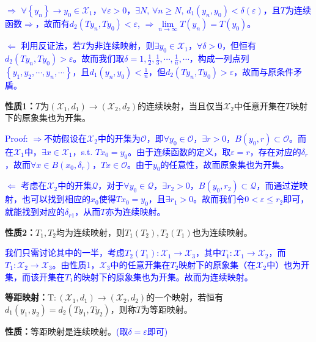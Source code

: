 \textcolor{blue}{$\Longrightarrow$ $\forall \left\lbrace y_n \right\rbrace\rightarrow y_0\in\mathscr{X}_1$，$\forall \varepsilon >0$，$\exists N$, $\forall n\ge N$, $d_1(y_n, y_0)<\delta(\varepsilon)$，且$T$为连续函数$\Longrightarrow$，故而有$d_2(Ty_n, Ty_0)<\varepsilon$, $\Longrightarrow \lim\limits_{n\to\infty} T(y_n) = T(y_0)$。}

\textcolor{blue}{$\Longleftarrow$ 利用反证法，若$T$为非连续映射，则$\exists y_0\in\mathscr{X}_1$，$\forall \delta>0$，但恒有$d_2(Ty_n, Ty_0)>\varepsilon$。故而我们取$\delta = 1, \frac{1}{2}, \frac{1}{3}, \cdots, \frac{1}{n}, \cdots$，构成一列点列$\left\lbrace y_1, y_2, \cdots, y_n, \cdots\right\rbrace$，且$d_1(y_n, y_0)<\frac{1}{n}$，但$d_2(Ty_n, Ty_0)>\varepsilon$，故而与原条件矛盾。}

\textbf{性质1：}$T$为$(\mathscr{X}_1, d_1)\rightarrow(\mathscr{X}_2, d_2)$的连续映射，当且仅当$\mathscr{X}_2$中任意开集在$T$映射下的原象集也为开集。

\textcolor{blue}{Proof: $\Longrightarrow$不妨假设在$\mathscr{X}_2$中的开集为$\mathscr{O}$，即$\forall y_0\in\mathscr{O}$，$\exists r>0$，$B(y_0, r)\subset \mathscr{O}$。而在$\mathscr{X}_1$中，$\exists x\in\mathscr{X}_1$，s.t. $Tx_0 = y_0$。由于连续函数的定义，取$\varepsilon = r$，存在对应的$\delta_r$，故而$\forall x\in B(x_0, \delta_r)$，$Tx \in\mathscr{O}$。由于$y_0$的任意性，故而原象集也为开集。}

\textcolor{blue}{$\Longleftarrow$ 考虑在$\mathscr{X}_2$中的开集$\mathscr{Q}$，对于$\forall y_0\in\mathscr{Q}$，$\exists r_2 > 0$，$B(y_0, r_2)\subset \mathscr{Q}$，而通过逆映射，也可以找到相应的$x_0$使得$Tx_0=y_0$，且$\exists r_1 >0$。故而我们令$0 < \varepsilon \le r_2$即可，就能找到对应的$\delta_{r1}$，从而$T$亦为连续映射。}

\textbf{性质2：}$T_1, T_2$均为连续映射，则$T_1(T_2), T_2(T_1)$也为连续映射。

\textcolor{blue}{我们只需讨论其中的一半，考虑$T_2(T_1): \mathscr{X}_1\rightarrow \mathscr{X_3}$，其中$T_1:\mathscr{X}_1\rightarrow \mathscr{X_2}$，而$T_1:\mathscr{X}_2\rightarrow \mathscr{X_3}$。由性质1，$\mathscr{X_3}$中的任意开集在$T_2$映射下的原象集（在$\mathscr{X}_2$中）也为开集，而该开集在$T_1$的映射下的原象集也为开集。故而为连续映射。}

\bigskip \noindent\textbf{等距映射：}T$:(\mathscr{X}_1,d_1)\longrightarrow(\mathscr{X}_2, d_2)$的一个映射，若恒有$d_1(y_1, y_2) = d_2(Ty_1, Ty_2)$，则称$T$为等距映射。

\textbf{性质：}等距映射是连续映射。\textcolor{blue}{(取$\delta = \varepsilon$即可)}
\bigskip

